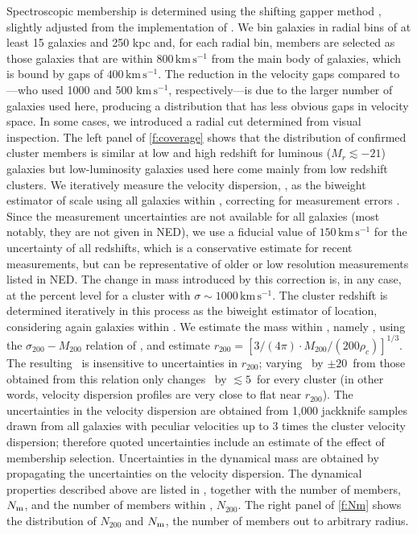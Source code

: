 Spectroscopic membership is determined using the shifting gapper method \citep{fadda96}, slightly 
adjusted from the implementation of \cite{sifon13}. We bin galaxies in radial bins of at least 15 
galaxies and 250 kpc and, for each radial bin, members are selected as those galaxies that are 
within $800\,\mathrm{km\,s^{-1}}$ from the main body of galaxies, which is bound by gaps of
$400\,\mathrm{km\,s^{-1}}$. The reduction in the velocity gaps compared to \cite{sifon13}---who 
used 1000 and 500 $\mathrm{km\,s^{-1}}$, respectively---is due to the larger number of galaxies 
used here, producing a distribution that has less obvious gaps in velocity space. In some cases, we 
introduced a radial cut determined from visual inspection. The left panel of \cref{f:coverage} 
shows that the distribution of confirmed cluster members is similar at low and high redshift for 
luminous ($M_r\lesssim-21$) galaxies but low-luminosity galaxies used here come mainly from low 
redshift clusters. We iteratively measure the velocity dispersion, \vdisp, as the biweight 
estimator of scale \citep{beers90} using all galaxies within \radius, correcting for measurement 
errors \citep{danese80}. Since the measurement uncertainties are not available for all galaxies 
(most notably, they are not given in NED), we use a fiducial value of $150\,\mathrm{km\,s^{-1}}$ 
for the uncertainty of all redshifts, which is a conservative estimate for recent measurements, but 
can be representative of older or low resolution measurements listed in NED. The change in mass 
introduced by this correction is, in any case, at the percent level for a cluster with 
$\sigma\sim1000\,\mathrm{km\,s^{-1}}$. The cluster redshift is determined iteratively in this 
process as the biweight estimator of location, considering again galaxies within \radius. We 
estimate the mass within \radius, namely \mass, using the $\sigma_{200}-M_{200}$ relation of 
\cite{evrard08}, and estimate $r_{200}=\left[3/(4\pi) \cdot M_{200}/(200\rho_c)\right]^{1/3}$. The 
resulting \vdisp\ is insensitive to uncertainties in $r_{200}$; varying \radius\ by $\pm20$\percent\ from 
those obtained from this relation only changes \vdisp\ by $\lesssim5$\percent\ for every cluster (in other 
words, velocity dispersion profiles are very close to flat near $r_{200}$). The uncertainties in 
the velocity dispersion are obtained from 1,000 jackknife samples drawn from all galaxies with 
peculiar velocities up to 3 times the cluster velocity dispersion; therefore quoted uncertainties 
include an estimate of the effect of membership selection. Uncertainties in the dynamical mass are 
obtained by propagating the uncertainties on the velocity dispersion. The dynamical properties 
described above are listed in , together with the number of members, $N_{\rm m}$, and 
the number of members within \radius, $N_{200}$. The right panel of \cref{f:Nm} shows the 
distribution of $N_{200}$ and $N_{\rm m}$, the number of members out to arbitrary radius.

